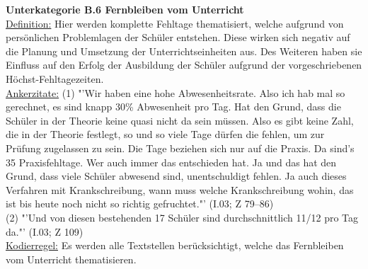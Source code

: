 \noindent
\textbf{Unterkategorie B.6 Fernbleiben vom Unterricht}\\
\underline{Definition:} Hier werden komplette Fehltage thematisiert, welche aufgrund von persönlichen Problemlagen der Schüler entstehen. Diese wirken sich negativ auf die Planung und Umsetzung der Unterrichtseinheiten aus. Des Weiteren haben sie Einfluss auf den Erfolg der Ausbildung der Schüler aufgrund der vorgeschriebenen Höchst-Fehltagezeiten.\\
\underline{Ankerzitate:} (1) "'Wir haben eine hohe Abwesenheitsrate. Also ich hab mal so gerechnet, es sind knapp 30\% Abwesenheit pro Tag. Hat den Grund, dass die Schüler in der Theorie keine quasi nicht da sein müssen. Also es gibt keine Zahl, die in der Theorie festlegt, so und so viele Tage dürfen die fehlen, um zur Prüfung zugelassen zu sein. Die Tage beziehen sich nur auf die Praxis. Da sind's 35 Praxisfehltage. Wer auch immer das entschieden hat. Ja und das hat den Grund, dass viele Schüler abwesend sind, unentschuldigt fehlen. Ja auch dieses Verfahren mit Krankschreibung, wann muss welche Krankschreibung wohin, das ist bis heute noch nicht so richtig gefruchtet."' (I.03; Z 79--86)\\ (2) "'Und von diesen bestehenden 17 Schüler sind durchschnittlich 11/12 pro Tag da."' (I.03; Z 109)\\
\underline{Kodierregel:} Es werden alle Textstellen berücksichtigt, welche das Fernbleiben vom Unterricht thematisieren.\\

